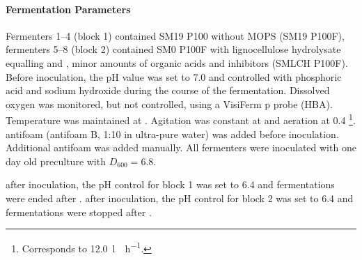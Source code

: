 \paragraph{Fermentation Parameters}
Fermenters \numrange{1}{4} (block 1) contained  SM19 P100 without MOPS (SM19 P100F), fermenters \numrange{5}{8} (block 2) contained  SM0 P100F with  lignocellulose hydrolysate equalling  \glc{} and  \xyl{}, minor amounts of organic acids and inhibitors (SMLCH P100F). Before inoculation, the pH value was set to \num{7.0} and controlled with  phosphoric acid and  sodium hydroxide during the course of the fermentation. Dissolved oxygen was monitored, but not controlled, using a VisiFerm p probe (HBA). Temperature was maintained at . Agitation was constant at  and aeration at \SI{0.4}{\vvm} \footnote{Corresponds to \SI{12.0}{\litre\norm\per\hour}.}.  antifoam (antifoam B, 1:10 in ultra-pure water) was added before inoculation. Additional antifoam was added manually. All fermenters were inoculated with  one day old preculture with $D_{600} = 6.8$.

 after inoculation, the pH control for block 1 was set to \num{6.4} and fermentations were ended after .  after inoculation, the pH control for block 2 was set to \num{6.4} and fermentations were stopped after .

